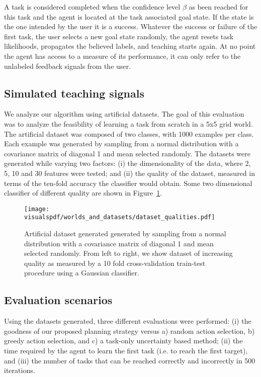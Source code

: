 A task is considered completed when the confidence level $\beta$ as been reached for this task and the agent is located at the task associated goal state. If the state is the one intended by the user it is a success. Whatever the success or failure of the first task, the user selects a new goal state randomly, the agent resets task likelihoods, propagates the believed labels, and teaching starts again. At no point the agent has access to a measure of its performance, it can only refer to the unlabeled feedback signals from the user.

\subsection{Simulated teaching signals}
\label{chapter:planning:artificialsignals}

We analyze our algorithm using artificial datasets. The goal of this evaluation was to analyze the feasibility of learning a task from scratch in a 5x5 grid world. The artificial dataset was composed of two classes, with 1000 examples per class. Each example was generated by sampling from a normal distribution with a covariance matrix of diagonal 1 and mean selected randomly. The datasets were generated while varying two factors: (i) the dimensionality of the data, where 2, 5, 10 and 30 features were tested; and (ii) the quality of the dataset, measured in terms of the ten-fold accuracy the classifier would obtain. Some two dimensional classifier of different quality are shown in Figure~\ref{fig:datasetsquality}.

\begin{figure}[!ht]
  \centering
      \texttt{[image: \\visualspdf/worlds\_and\_datasets/dataset\_qualities.pdf]}
      \caption{Artificial dataset generated generated by sampling from a normal distribution with a covariance matrix of diagonal 1 and mean selected randomly. From left to right, we show dataset of increasing quality as measured by a 10 fold cross-validation train-test procedure using a Gaussian classifier.}
    \label{fig:datasetsquality}
\end{figure}


\subsection{Evaluation scenarios}

Using the datasets generated, three different evaluations were performed: (i) the goodness of our proposed planning strategy versus a) random action selection, b) greedy action selection, and c) a task-only uncertainty based method; (ii) the time required by the agent to learn the first task (i.e. to reach the first target), and (iii) the number of tasks that can be reached correctly and incorrectly in 500 iterations.

